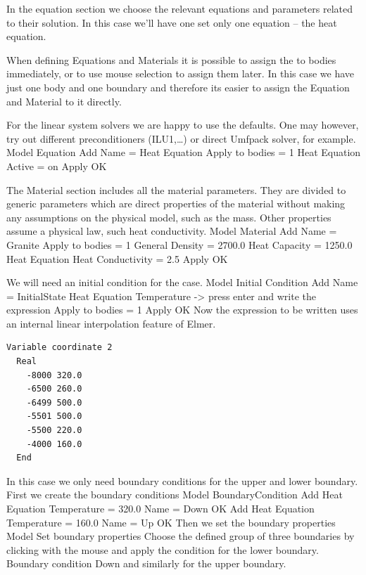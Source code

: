 In the equation section we choose the relevant equations and parameters related to their solution. 
In this case we'll have one set only one equation -- the heat equation.


When defining Equations and Materials it is possible to assign the to bodies immediately, or to use mouse
selection to assign them later. In this case we have just one body and one boundary and therefore its easier to assign 
the Equation and Material to it directly.

For the linear system solvers we are happy to use the defaults. One may however, try out different
preconditioners (ILU1,\ldots) or direct Umfpack solver, for example.
\ttbegin
Model
  Equation
    Add 
      Name = Heat Equation
      Apply to bodies = 1
      Heat Equation
        Active = on
  Apply   
  OK
\ttend        

The Material section includes all the material parameters.
They are divided to generic parameters which are direct properties of the material
without making any assumptions on the physical model, such as the mass. Other properties assume
a physical law, such heat conductivity.
\ttbegin
Model
  Material
    Add 
      Name = Granite
      Apply to bodies = 1 
      General    
        Density = 2700.0
        Heat Capacity = 1250.0
      Heat Equation
        Heat Conductivity = 2.5
    Apply
    OK
\ttend

We will need an initial condition for the case. 
\ttbegin
Model
  Initial Condition
    Add 
      Name = InitialState
      Heat Equation
        Temperature -> press enter and write the expression
      Apply to bodies = 1
    Apply
    OK
\ttend    
Now the expression to be written uses an internal linear interpolation feature of Elmer. 
\begin{verbatim}
Variable coordinate 2
  Real
    -8000 320.0
    -6500 260.0
    -6499 500.0
    -5501 500.0
    -5500 220.0
    -4000 160.0
  End
\end{verbatim}

In this case we only need boundary conditions for the upper and lower boundary.
First we create the boundary conditions
\ttbegin
Model
  BoundaryCondition
    Add 
      Heat Equation
        Temperature = 320.0
      Name = Down
      OK
    Add 
      Heat Equation
        Temperature = 160.0
      Name = Up
      OK
\ttend   
Then we set the boundary properties 
\ttbegin
Model 
  Set boundary properties  
\ttend
Choose the defined group of three boundaries by clicking with the mouse
and apply the condition for the lower boundary.
\ttbegin
Boundary condition
  Down
\ttend
and similarly for the upper boundary. 


